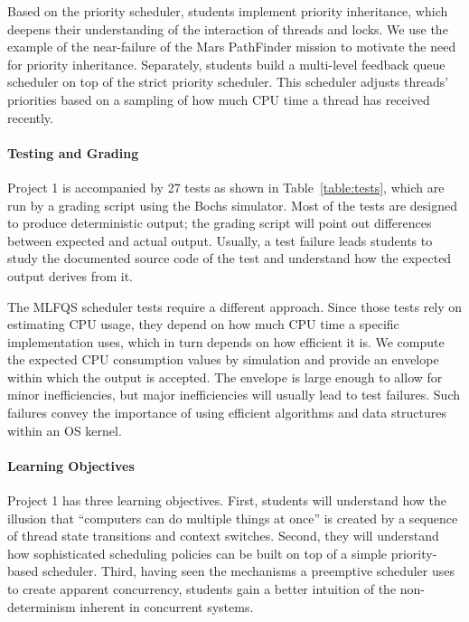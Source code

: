 Based on the priority scheduler, students implement priority inheritance, 
which deepens their understanding of the interaction of threads and locks.
We use the example of the near-failure of the Mars PathFinder mission to motivate
the need for priority inheritance.  
Separately, students build a multi-level feedback queue scheduler on top of the strict
priority scheduler.  This scheduler adjusts threads' priorities based on a sampling  
of how much CPU time a thread has received recently.

\paragraph{Testing and Grading}
Project 1 is accompanied by 27 tests as shown in Table~\ref{table:tests}, which are 
run by a grading script using the Bochs simulator.
Most of the tests are designed to produce deterministic output; 
the grading script will point out differences between expected and actual output. 
Usually, a test failure leads students to study the documented source code of the test
and understand how the expected output derives from it.

The MLFQS scheduler tests require a different approach.  Since those tests rely on estimating CPU
usage, they depend on how much CPU time a specific implementation uses, which in turn depends on how
efficient it is.  We compute the expected CPU consumption values by simulation and provide an
envelope within which the output is accepted.  The envelope is large enough to allow for minor
inefficiencies, but major inefficiencies will usually lead to test failures.  Such failures
convey the importance of using efficient algorithms and data structures within an OS kernel.

\paragraph{Learning Objectives}
Project 1 has three learning objectives.  First, students will understand how
the illusion that ``computers can do multiple things at once'' is created by a sequence
of thread state transitions and context switches.  Second, they will understand how
sophisticated scheduling policies can be built on top of a simple priority-based scheduler.
Third, having seen the mechanisms a preemptive scheduler uses to create apparent 
concurrency, students gain a better intuition of the non-determinism inherent 
in concurrent systems. 

